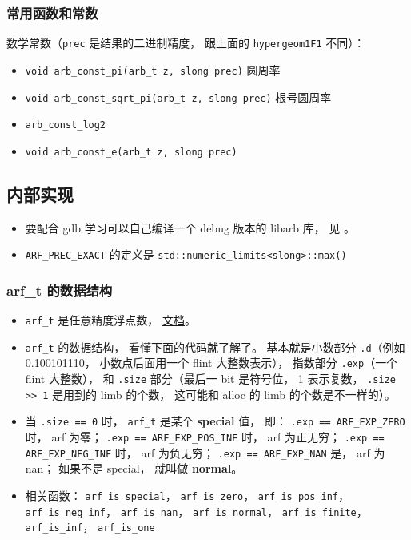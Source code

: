 \subsubsection{常用函数和常数}
数学常数（\verb`prec` 是结果的二进制精度， 跟上面的 \verb`hypergeom1F1` 不同）：
\begin{itemize}
\item \verb`void arb_const_pi(arb_t z, slong prec)` 圆周率
\item \verb`void arb_const_sqrt_pi(arb_t z, slong prec)` 根号圆周率
\item \verb`arb_const_log2`
\item \verb`void arb_const_e(arb_t z, slong prec)`
\end{itemize}


\subsection{内部实现}
\begin{itemize}
\item 要配合 gdb 学习可以自己编译一个 debug 版本的 libarb 库， 见 。
\item \verb`ARF_PREC_EXACT` 的定义是 \verb`std::numeric_limits<slong>::max()`
\end{itemize}

\subsubsection{arf\_t 的数据结构}
\begin{itemize}
\item \verb`arf_t` 是任意精度浮点数， \href{https://arblib.org/arf.html}{文档}。
\item \verb`arf_t` 的数据结构， 看懂下面的代码就了解了。 基本就是小数部分 \verb`.d`（例如 0.100101110， 小数点后面用一个 flint 大整数表示）， 指数部分 \verb`.exp`（一个 flint 大整数）， 和 \verb`.size` 部分（最后一 bit 是符号位， 1 表示复数， \verb`.size >> 1` 是用到的 limb 的个数， 这可能和 alloc 的 limb 的个数是不一样的）。
\item 当 \verb`.size == 0` 时， \verb`arf_t` 是某个 \textbf{special} 值， 即： \verb`.exp == ARF_EXP_ZERO` 时， arf 为零； \verb`.exp == ARF_EXP_POS_INF` 时， arf 为正无穷； \verb`.exp == ARF_EXP_NEG_INF` 时， arf 为负无穷； \verb`.exp == ARF_EXP_NAN` 是， arf 为 nan； 如果不是 special， 就叫做 \textbf{normal}。
\item 相关函数： \verb`arf_is_special`， \verb`arf_is_zero`， \verb`arf_is_pos_inf`， \verb`arf_is_neg_inf`， \verb`arf_is_nan`， \verb`arf_is_normal`， \verb`arf_is_finite`， \verb`arf_is_inf`， \verb`arf_is_one`
\end{itemize}

